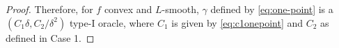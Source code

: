 \begin{proof}
Therefore, for $f$ convex and $L$-smooth, $\gamma$ defined by \eqref{eq:one-point} is a $(C_1\delta, C_2/\delta^2)$ type-I oracle, where $C_1$ is given by \eqref{eq:c1onepoint} and $C_2$ as defined in Case 1.

\end{proof}

